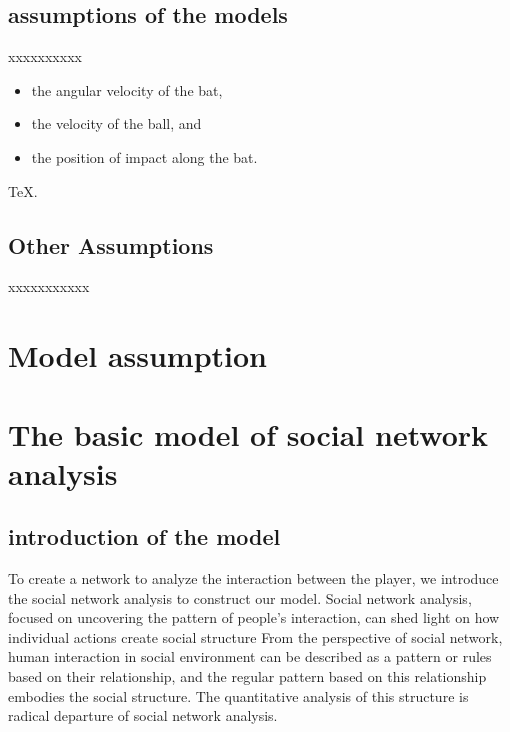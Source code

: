 \documentclass{mcmthesis}
\begin{document}
\subsection{assumptions of the models}

xxxxxxxxxx
\begin{itemize}
\item the angular velocity of the bat,
\item the velocity of the ball, and
\item the position of impact along the bat.
\end{itemize}



\TeX .

\subsection{Other Assumptions}
xxxxxxxxxxx

\section{Model assumption}







\section{The basic model of social network analysis}
\subsection{introduction of the model}
To create a network to analyze the interaction between the player,
we introduce the social network analysis to construct our model.
Social network analysis, focused on uncovering the pattern of
people's interaction, can shed light on how individual actions create social structure
From the perspective of social network, human interaction in social
environment can be described as a pattern or rules based on their relationship, 
and the regular pattern based on this relationship embodies the social structure.
The quantitative analysis of this structure is radical departure of social 
network analysis.
\end{document}
